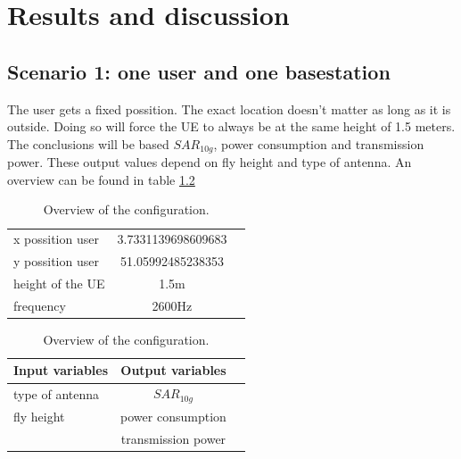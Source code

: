 \chapter{Results and discussion}
\section{Scenario 1: one user and one basestation}

The user gets a fixed possition. The exact location doesn't matter as long as it is outside. Doing so will force the \gls{UE} 
to always be at the same height of 1.5 meters. The conclusions will be based $SAR_{10g}$, power consumption and transmission power.
These output values depend on fly height and type of antenna. An overview can be found in table \ref{table:confOverviewScenario1}

\begin{table}[!htb]
    \begin{minipage}{.5\linewidth}
      \centering
        \begin{tabular}{|l|c|l|}
        \hline
        x possition user               & 3.7331139698609683        \\    
        y possition user               & 51.05992485238353           \\ 
        height of the \gls{UE}         & 1.5m                      \\ 
        frequency                      & 2600Hz                   \\ 
        \hline
        \end{tabular}
    \end{minipage}%
    \begin{minipage}{.5\linewidth}
      \centering
            \begin{tabular}{|l|c|l|}
            \hline
            Input variables                & Output variables          \\   \hline 
            type of antenna                & $SAR_{10g}$               \\ 
            fly height                     & power consumption             \\ 
                                           & transmission power            \\ 
            \hline
            \end{tabular}
    \end{minipage} 
        \caption{Overview of the configuration.}
        \label{table:confOverviewScenario1}
\end{table}

